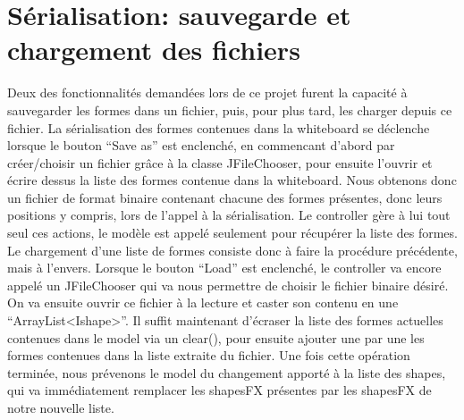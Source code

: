 \chapter{Sérialisation: sauvegarde et chargement des fichiers}


Deux des fonctionnalités demandées lors de ce projet furent la capacité à
sauvegarder les formes dans un fichier, puis, pour plus tard, les charger
depuis ce fichier.\newline
La sérialisation des formes contenues dans la whiteboard se déclenche lorsque
le bouton ``Save as'' est enclenché, en
commencant d'abord par créer/choisir un fichier grâce à la classe JFileChooser,
pour ensuite l'ouvrir et écrire dessus la liste des formes contenue dans la
whiteboard. Nous obtenons donc un fichier de format binaire contenant chacune des
formes présentes, donc leurs positions y compris, lors de l'appel à la
sérialisation. Le controller gère à lui tout seul ces actions, le modèle est
appelé seulement pour récupérer la liste des formes.\newline
Le chargement d'une liste de formes consiste donc à faire la procédure
précédente, mais à l'envers. Lorsque le bouton ``Load'' est enclenché, le
controller va encore appelé un JFileChooser qui va nous permettre de choisir
le fichier binaire désiré. On va ensuite ouvrir ce fichier à la lecture et
caster son contenu en une ``ArrayList<Ishape>''. Il suffit maintenant d'écraser la
liste des formes actuelles contenues dans le model via un clear(), pour
ensuite ajouter une par une les formes contenues dans la liste extraite du
fichier. Une fois cette opération terminée, nous prévenons le model du
changement apporté à la liste des shapes, qui va immédiatement remplacer les
shapesFX présentes par les shapesFX de notre nouvelle liste.

